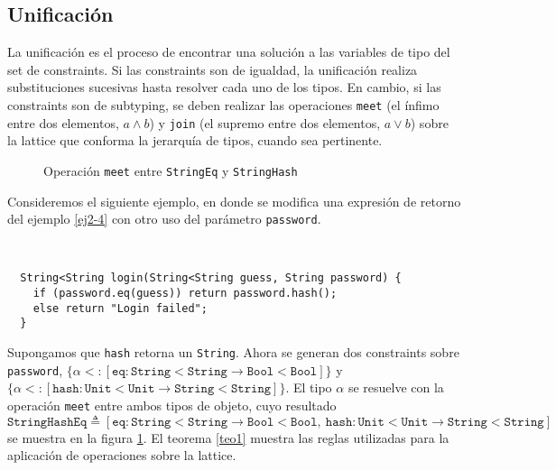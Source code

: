 \subsection{Unificación}
La unificación es el proceso de encontrar una solución a las variables de tipo del set de constraints. Si las constraints son de igualdad, la unificación realiza substituciones sucesivas hasta resolver cada uno de los tipos. En cambio, si las constraints son de subtyping, se deben realizar las operaciones \texttt{meet} (el ínfimo entre dos elementos, $a \wedge b$) y \texttt{join} (el supremo entre dos elementos, $a \vee b$) sobre la lattice que conforma la jerarquía de tipos, cuando sea pertinente.

\begin{figure}[ht]
  \centering
  \caption{Operación \texttt{meet} entre \texttt{StringEq} y \texttt{StringHash}}
  \label{latticeInference}
\end{figure}

Consideremos el siguiente ejemplo, en donde se modifica una expresión de retorno del ejemplo \ref{ej2-4} con otro uso del parámetro \texttt{password}.

\begin{ej} \ \\
  \normalfont
  \label{ej2-5}
\begin{lstlisting}
  String<String login(String<String guess, String password) {
  	if (password.eq(guess)) return password.hash();
  	else return "Login failed";
  }
\end{lstlisting}
\end{ej}

Supongamos que \texttt{hash} retorna un \texttt{String}. Ahora se generan dos constraints sobre \texttt{password}, $\{\alpha <: [\mathtt{eq} : \mathtt{String<String} \rightarrow \mathtt{Bool<Bool}]\}$ y $\{\alpha <: [\mathtt{hash} : \mathtt{Unit<Unit} \rightarrow \mathtt{String<String}]\}$. El tipo $\alpha$ se resuelve con la operación \texttt{meet} entre ambos tipos de objeto, cuyo resultado $\mathtt{StringHashEq} \triangleq [\mathtt{eq} : \mathtt{String<String} \rightarrow \mathtt{Bool<Bool},\ \mathtt{hash} : \mathtt{Unit<Unit} \rightarrow \mathtt{String<String}]$ se muestra en la figura \ref{latticeInference}. El teorema \ref{teo1} muestra las reglas utilizadas para la aplicación de operaciones sobre la lattice.

